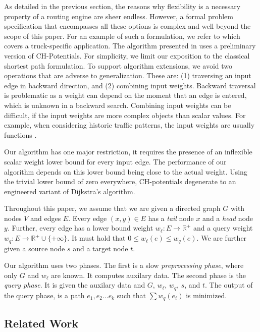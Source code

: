 \documentclass[sigconf]{acmart}
\begin{document}
As detailed in the previous section, the reasons why flexibility is a necessary property of a routing engine are sheer endless.
However, a formal problem specification that encompasses all these options is complex and well beyond the scope of this paper.
For an example of such a formulation, we refer to \cite{kswz-erptd-20} which covers a truck-specific application.
The algorithm presented in \cite{kswz-erptd-20} uses a preliminary version of CH-Potentials.
For simplicity, we limit our exposition to the classical shortest path formulation.
To support algorithm extensions, we avoid two operations that are adverse to generalization.
These are:
(1) traversing an input edge in backward direction, and
(2) combining input weights.
Backward traversal is problematic as a weight can depend on the moment that an edge is entered, which is unknown in a backward search.
Combining input weights can be difficult, if the input weights are more complex objects than scalar values.
For example, when considering historic traffic patterns, the input weights are usually functions \cite{citation needed}.

Our algorithm has one major restriction, it requires the presence of an inflexible scalar weight lower bound for every input edge.
The performance of our algorithm depends on this lower bound being close to the actual weight.
Using the trivial lower bound of zero everywhere, CH-potentials degenerate to an engineered variant of Dijkstra's algorithm.

Throughout this paper, we assume that we are given a directed graph $G$ with nodes $V$ and edges $E$.
Every edge $(x,y)\in E$ has a \emph{tail} node $x$ and a \emph{head} node $y$.
Further, every edge has a lower bound weight $w_\ell:E\rightarrow \mathbb{R}^+$ and a query weight $w_q:E\rightarrow \mathbb{R}^+ \cup \{+\infty\}$.
It must hold that $0\le w_\ell(e)\le w_q(e)$.
We are further given a source node $s$ and a target node $t$.

Our algorithm uses two phases.
The first is a slow \emph{preprocessing phase}, where only $G$ and $w_\ell$ are known.
It computes auxilary data.
The second phase is the \emph{query phase}.
It is given the auxilary data and $G$, $w_\ell$, $w_q$, $s$, and $t$.
The output of the query phase, is a path $e_1,e_2\ldots e_k$ such that $\sum w_q(e_i)$ is minimized.

\subsection{Related Work}
\end{document}

